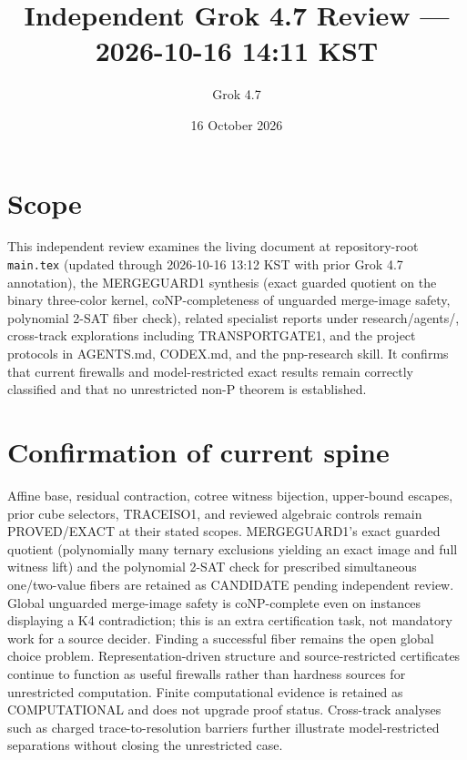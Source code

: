 \documentclass[11pt]{article}
\title{Independent Grok 4.7 Review --- 2026-10-16 14:11 KST}
\author{Grok 4.7}
\date{16 October 2026}
\begin{document}
\maketitle

\begin{center}
\end{center}

\section{Scope}
This independent review examines the living document at repository-root \texttt{main.tex} (updated through 2026-10-16 13:12 KST with prior Grok 4.7 annotation), the MERGEGUARD1 synthesis (exact guarded quotient on the binary three-color kernel, coNP-completeness of unguarded merge-image safety, polynomial 2-SAT fiber check), related specialist reports under research/agents/, cross-track explorations including TRANSPORTGATE1, and the project protocols in AGENTS.md, CODEX.md, and the pnp-research skill. It confirms that current firewalls and model-restricted exact results remain correctly classified and that no unrestricted non-P theorem is established.

\section{Confirmation of current spine}
Affine base, residual contraction, cotree witness bijection, upper-bound escapes, prior cube selectors, TRACEISO1, and reviewed algebraic controls remain PROVED/EXACT at their stated scopes. MERGEGUARD1's exact guarded quotient (polynomially many ternary exclusions yielding an exact image and full witness lift) and the polynomial 2-SAT check for prescribed simultaneous one/two-value fibers are retained as CANDIDATE pending independent review. Global unguarded merge-image safety is coNP-complete even on instances displaying a K4 contradiction; this is an extra certification task, not mandatory work for a source decider. Finding a successful fiber remains the open global choice problem. Representation-driven structure and source-restricted certificates continue to function as useful firewalls rather than hardness sources for unrestricted computation. Finite computational evidence is retained as COMPUTATIONAL and does not upgrade proof status. Cross-track analyses such as charged trace-to-resolution barriers further illustrate model-restricted separations without closing the unrestricted case.
\end{document}
